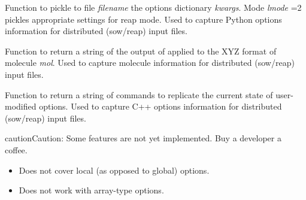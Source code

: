 \documentclass[letterpaper,10pt,english]{sphinxmanual}
\begin{document}
\begin{fulllineitems}
\label{index:procutil.format_kwargs_for_input}
Function to pickle to file \emph{filename} the options dictionary
\emph{kwargs}. Mode \emph{lmode} =2 pickles appropriate settings for
reap mode. Used to capture Python options information for
distributed (sow/reap) input files.

\end{fulllineitems}


\begin{fulllineitems}
\label{index:procutil.format_molecule_for_input}
Function to return a string of the output of
{\hyperref[index:input.process_input]{}} applied to the XYZ
format of molecule \emph{mol}. Used to capture molecule
information for distributed (sow/reap) input files.

\end{fulllineitems}


\begin{fulllineitems}
\label{index:procutil.format_options_for_input}
Function to return a string of commands to replicate the
current state of user-modified options. Used to capture C++
options information for distributed (sow/reap) input files.

\begin{notice}{caution}{Caution:}
Some features are not yet implemented. Buy a developer a coffee.
\begin{itemize}
\item {} 
Does not cover local (as opposed to global) options.

\item {} 
Does not work with array-type options.

\end{itemize}
\end{notice}

\end{fulllineitems}

\end{document}
